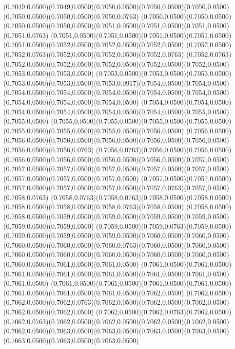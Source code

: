 (0.7049,0.0500)(0.7049,0.0500)(0.7050,0.0500)(0.7050,0.0500)(0.7050,0.0500)(0.7050,0.0500)(0.7050,0.0500)(0.7050,0.0763)
(0.7050,0.0500)(0.7050,0.0500)(0.7050,0.0500)(0.7050,0.0500)(0.7051,0.0500)(0.7051,0.0500)(0.7051,0.0500)(0.7051,0.0763)
(0.7051,0.0500)(0.7051,0.0500)(0.7051,0.0500)(0.7051,0.0500)(0.7051,0.0500)(0.7052,0.0500)(0.7052,0.0500)(0.7052,0.0500)
(0.7052,0.0500)(0.7052,0.0763)(0.7052,0.0500)(0.7052,0.0500)(0.7052,0.0763)
\PST@Solid(0.7052,0.0763)(0.7052,0.0500)(0.7052,0.0500)(0.7052,0.0500)(0.7052,0.0500)(0.7052,0.0500)(0.7053,0.0500)(0.7053,0.0500)
(0.7053,0.0500)(0.7053,0.0500)(0.7053,0.0500)(0.7053,0.0500)(0.7053,0.0500)(0.7053,0.0917)(0.7054,0.0500)(0.7054,0.0500)
(0.7054,0.0500)(0.7054,0.0500)(0.7054,0.0500)(0.7054,0.0500)(0.7054,0.0500)(0.7054,0.0500)(0.7054,0.0500)(0.7054,0.0500)
(0.7054,0.0500)(0.7054,0.0500)(0.7054,0.0500)(0.7054,0.0500)(0.7054,0.0500)(0.7054,0.0500)(0.7055,0.0500)(0.7055,0.0500)
(0.7055,0.0500)(0.7055,0.0500)(0.7055,0.0500)(0.7055,0.0500)(0.7055,0.0500)(0.7055,0.0500)(0.7055,0.0500)(0.7056,0.0500)
(0.7056,0.0500)(0.7056,0.0500)(0.7056,0.0500)(0.7056,0.0500)(0.7056,0.0500)(0.7056,0.0500)(0.7056,0.0500)(0.7056,0.0763)
(0.7056,0.0763)(0.7056,0.0500)(0.7056,0.0500)(0.7056,0.0500)(0.7056,0.0500)(0.7056,0.0500)(0.7056,0.0500)(0.7057,0.0500)
(0.7057,0.0500)(0.7057,0.0500)(0.7057,0.0500)(0.7057,0.0500)(0.7057,0.0500)(0.7057,0.0500)(0.7057,0.0500)(0.7057,0.0500)
(0.7057,0.0500)(0.7057,0.0500)(0.7057,0.0500)(0.7057,0.0500)(0.7057,0.0500)(0.7057,0.0763)(0.7057,0.0500)(0.7058,0.0763)
(0.7058,0.0763)(0.7058,0.0763)(0.7058,0.0500)(0.7058,0.0500)(0.7058,0.0500)(0.7058,0.0500)(0.7058,0.0763)(0.7058,0.0500)
(0.7058,0.0500)(0.7058,0.0500)(0.7059,0.0500)(0.7059,0.0500)(0.7059,0.0500)(0.7059,0.0500)(0.7059,0.0500)(0.7059,0.0500)
(0.7059,0.0500)(0.7059,0.0763)(0.7059,0.0500)(0.7059,0.0500)(0.7059,0.0500)(0.7059,0.0500)(0.7060,0.0500)(0.7060,0.0500)
(0.7060,0.0500)(0.7060,0.0500)(0.7060,0.0763)(0.7060,0.0500)(0.7060,0.0500)
\PST@Solid(0.7060,0.0500)(0.7060,0.0500)(0.7060,0.0500)(0.7060,0.0500)(0.7060,0.0500)(0.7060,0.0500)(0.7061,0.0500)(0.7061,0.0500)
(0.7061,0.0500)(0.7061,0.0500)(0.7061,0.0500)(0.7061,0.0500)(0.7061,0.0500)(0.7061,0.0500)(0.7061,0.0500)(0.7061,0.0500)
(0.7061,0.0500)(0.7061,0.0500)(0.7061,0.0500)(0.7061,0.0500)(0.7061,0.0500)(0.7061,0.0500)(0.7061,0.0500)(0.7062,0.0500)
(0.7062,0.0500)(0.7062,0.0500)(0.7062,0.0763)(0.7062,0.0500)(0.7062,0.0500)(0.7062,0.0500)(0.7062,0.0500)(0.7062,0.0500)
(0.7062,0.0500)(0.7062,0.0763)(0.7062,0.0500)(0.7062,0.0763)(0.7062,0.0500)(0.7062,0.0500)(0.7062,0.0500)(0.7062,0.0500)
(0.7062,0.0500)(0.7063,0.0500)(0.7063,0.0500)(0.7063,0.0500)(0.7063,0.0500)(0.7063,0.0500)(0.7063,0.0500)(0.7063,0.0500)
